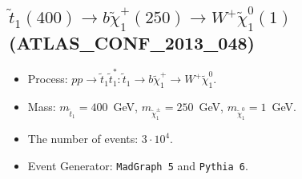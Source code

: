 \documentclass[12pt]{article}
\begin{document}
    
\subsection{$\tilde t_1(400) \to b \tilde \chi_1^+(250) \to W^+ \tilde \chi_1^0(1)$ (ATLAS\_CONF\_2013\_048)} 


        \begin{itemize}
        \item  Process: $pp \to \tilde t_1 \tilde t_1^*: \tilde t_1 \to b \tilde \chi_1^+ \to W^+ \tilde \chi_1^0$.
        \item  Mass: $m_{\tilde t_1} = 400$~GeV, $m_{\tilde \chi_1^\pm} = 250$~GeV, $m_{\tilde \chi_1^0} = 1$~GeV.
        \item  The number of events: $3 \cdot 10^4$.
        \item  Event Generator: {\tt MadGraph 5} and {\tt Pythia 6}.    
        \end{itemize}    
    
\end{document}

